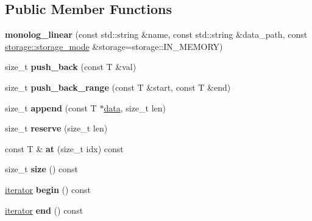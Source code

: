 \subsection*{Public Member Functions}
\begin{DoxyCompactItemize}
\item 
\mbox{\label{classdialog_1_1monolog_1_1monolog__linear_a4a41bea32990a839ad4b5cf335637332}} 
{\bfseries monolog\+\_\+linear} (const std\+::string \&name, const std\+::string \&data\+\_\+path, const \hyperlink{structdialog_1_1storage_1_1storage__mode}{storage\+::storage\+\_\+mode} \&storage=storage\+::\+I\+N\+\_\+\+M\+E\+M\+O\+RY)
\item 
\mbox{\label{classdialog_1_1monolog_1_1monolog__linear_afebe4e6129d5d71e8dc529047d5acae2}} 
size\+\_\+t {\bfseries push\+\_\+back} (const T \&val)
\item 
\mbox{\label{classdialog_1_1monolog_1_1monolog__linear_adcc106b67ab06eeb8c8283bc549f2598}} 
size\+\_\+t {\bfseries push\+\_\+back\+\_\+range} (const T \&start, const T \&end)
\item 
\mbox{\label{classdialog_1_1monolog_1_1monolog__linear_aa77371cef9ef60420c54c196cb1c0c4d}} 
size\+\_\+t {\bfseries append} (const T $\ast$\hyperlink{structdialog_1_1data}{data}, size\+\_\+t len)
\item 
\mbox{\label{classdialog_1_1monolog_1_1monolog__linear_a78ba15a7a6d22fc693b90be95a986278}} 
size\+\_\+t {\bfseries reserve} (size\+\_\+t len)
\item 
\mbox{\label{classdialog_1_1monolog_1_1monolog__linear_a40eb17ee39bb8cb2cf920102f2ecb7bf}} 
const T \& {\bfseries at} (size\+\_\+t idx) const
\item 
\mbox{\label{classdialog_1_1monolog_1_1monolog__linear_a3e65b10aca673058e344c10022dca01f}} 
size\+\_\+t {\bfseries size} () const
\item 
\mbox{\label{classdialog_1_1monolog_1_1monolog__linear_af294efb6d41e8f0449f5fd256c5a0af4}} 
\hyperlink{classdialog_1_1monolog_1_1monolog__iterator}{iterator} {\bfseries begin} () const
\item 
\mbox{\label{classdialog_1_1monolog_1_1monolog__linear_aa13bd42e4ad0fe5b8c8e645b367d161f}} 
\hyperlink{classdialog_1_1monolog_1_1monolog__iterator}{iterator} {\bfseries end} () const
\end{DoxyCompactItemize}
